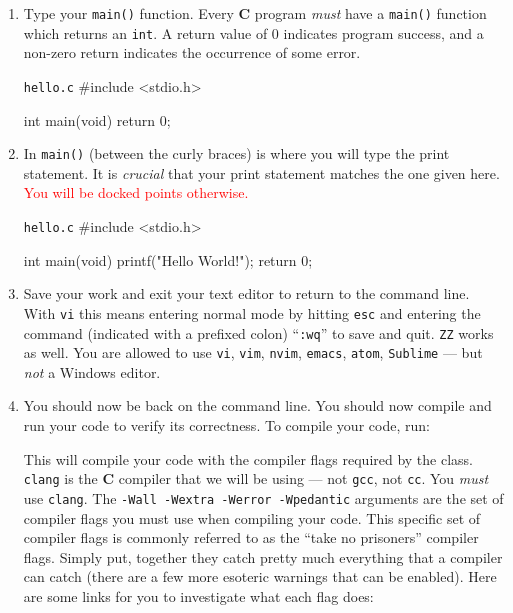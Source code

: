 \begin{enumerate}
  \item Type your \texttt{main()} function. Every \textbf{C} program \emph{must}
    have a \texttt{main()} function which returns an \texttt{int}. A
    return value of 0 indicates program success, and a non-zero return
    indicates the occurrence of some error.

\begin{clisting}{\texttt{hello.c}}
#include <stdio.h>

int main(void) {
    return 0;
}
\end{clisting}

  \item In \texttt{main()} (between the curly braces) is where you will type the
    print statement. It is \emph{crucial} that your print statement matches the
    one given here. \textcolor{red}{You will be docked points otherwise.}

\begin{clisting}{\texttt{hello.c}}
#include <stdio.h>

int main(void) {
    printf("Hello World!\n");
    return 0;
}
\end{clisting}

  \item Save your work and exit your text editor to return to the command line.
    With \texttt{vi} this means entering normal mode by hitting
    \texttt{esc} and entering the command (indicated with a prefixed
    colon) ``\texttt{:wq}'' to save and quit. \texttt{ZZ} works as well.
    You are allowed to use \texttt{vi}, \texttt{vim}, \texttt{nvim},
    \texttt{emacs}, \texttt{atom}, \texttt{Sublime} --- but \emph{not} a
    Windows editor.

  \item You should now be back on the command line. You should now compile and
    run your code to verify its correctness. To compile your code, run:


    This will compile your code with the compiler flags required by the class.
    \texttt{clang} is the \textbf{C} compiler that we will be using --- not
    \texttt{gcc}, not \texttt{cc}. You \emph{must} use \texttt{clang}. The
    \texttt{-Wall -Wextra -Werror -Wpedantic} arguments are the set of compiler
    flags you must use when compiling your code. This specific set of compiler
    flags is commonly referred to as the ``take no prisoners'' compiler flags.
    Simply put, together they catch pretty much everything that a compiler can
    catch (there are a few more esoteric warnings that can be enabled). Here are
    some links for you to investigate what each flag does:


\end{enumerate}
